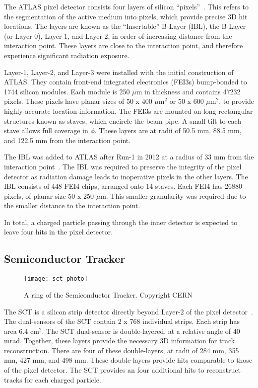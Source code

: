 The ATLAS pixel detector consists four layers of silicon ``pixels''~\cite{Aad:2008zz}.
This refers to the segmentation of the active medium into pixels, which provide precise 3D hit locations.
The layers are known as the ``Insertable'' B-Layer (IBL), the B-Layer (or Layer-0), Layer-1, and Layer-2, in order of increasing distance from the interaction point.
These layers are close to the interaction point, and therefore experience significant radiation exposure.

Layer-1, Layer-2, and Layer-3 were installed with the initial construction of ATLAS.
They contain front-end integrated electronics (FEI3s) bump-bonded to 1744 silicon modules.
Each module is 250 $\mu$m in thickness and contains 47232 pixels.
These pixels have planar sizes of 50 x 400 $\mu \mathrm{m}^2$ or 50 x 600 $\mu \mathrm{m}^2$, to provide highly accurate location information.
The FEI3s are mounted on long rectangular structures known as staves, which encircle the beam pipe.
A small tilt to each stave allows full coverage in $\phi$.
These layers are at radii of 50.5 mm, 88.5 mm, and 122.5 mm from the interaction point.

The IBL was added to ATLAS after Run-1 in 2012 at a radius of 33 mm from the interaction point~\cite{B-layerRef}.
The IBL was required to preserve the integrity of the pixel detector as radiation damage leads to inoperative pixels in the other layers.
The IBL consists of 448 FEI4 chips, arranged onto 14 staves.
Each FEI4 has 26880 pixels, of planar size 50 x 250 $\mu$m.
This smaller granularity was required due to the smaller distance to the interaction point.

In total, a charged particle passing through the inner detector is expected to leave four hits in the pixel detector.

\subsection{Semiconductor Tracker}
\begin{figure}[tbp]
\caption{A ring of the Semiconductor Tracker. Copyright CERN} \label{fig:sct_photo}
\texttt{[image: sct\_photo]}
\end{figure}

The SCT is a silicon strip detector directly beyond Layer-2 of the pixel detector~\cite{IDET-2013-01}.
The dual-sensors of the SCT contain 2 x 768 individual strips.
Each strip has area 6.4 cm$^2$.
The SCT dual-sensor is double-layered, at a relative angle of 40 mrad.
Together, these layers provide the necessary 3D information for track reconstruction.
There are four of these double-layers, at radii of 284 mm, 355 mm, 427 mm, and 498 mm.
These double-layers provide hits comparable to those of the pixel detector.
The SCT provides an four additional hits to reconstruct tracks for each charged particle.

